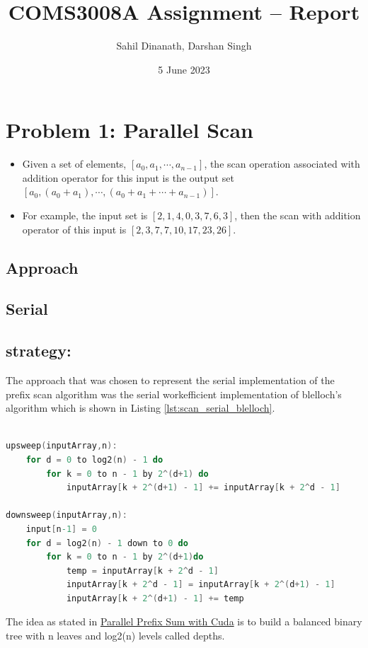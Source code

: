 
\title{COMS3008A Assignment -- Report}
\author{Sahil Dinanath, Darshan Singh}
\date{5 June 2023} 
\maketitle 
\pagestyle{fancy}
\fancyhf{}
\fancyhead[R]{\thepage}
{} 
\section{Problem 1: Parallel Scan}
\begin{itemize}
	\item  Given a set of elements, $[a_0,a_1,\dotsm,a_{n-1}]$, the scan operation associated with addition operator for this input is the output set $[a_0,(a_0+a_1),\dotsm,(a_0+a_1+\dotsm+a_{n-1})]$. 
	\item For example, the input set is $[2,1,4,0,3,7,6,3]$, then the scan with addition operator of this input is $[2,3,7,7,10,17,23,26]$. 
\end{itemize}
\subsection*{Approach}
\subsection{Serial} 
\subsection*{strategy:}
The approach that was chosen to represent the serial implementation of the prefix scan algorithm was the serial workefficient implementation of blelloch's algorithm which is shown in Listing \ref{lst:scan_serial_blelloch}. 
\begin{lstlisting}[language=C, caption={upsweep and downsweep pseudocode}, label={lst:scan_serial_blelloch}]

upsweep(inputArray,n):
	for d = 0 to log2(n) - 1 do
    	for k = 0 to n - 1 by 2^(d+1) do
        	inputArray[k + 2^(d+1) - 1] += inputArray[k + 2^d - 1]

downsweep(inputArray,n):
	input[n-1] = 0
	for d = log2(n) - 1 down to 0 do 
		for k = 0 to n - 1 by 2^(d+1)do 
			temp = inputArray[k + 2^d - 1] 
			inputArray[k + 2^d - 1] = inputArray[k + 2^(d+1) - 1]
			inputArray[k + 2^(d+1) - 1] += temp

\end{lstlisting}
The idea as stated in \href{https://developer.nvidia.com/gpugems/gpugems3/part-vi-gpu-computing/chapter-39-parallel-prefix-sum-scan-cuda}{Parallel Prefix Sum with Cuda} is to build a balanced binary tree with n leaves and log2(n) levels called depths.

